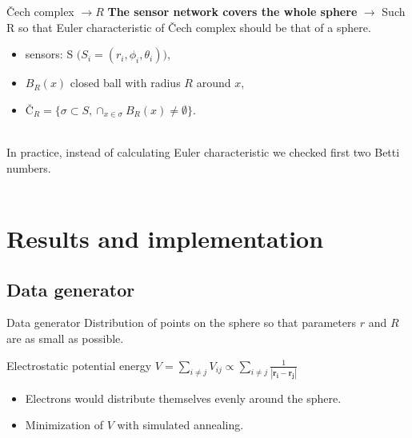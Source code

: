 \documentclass{beamer}
\newcommand{\vect}[1]{\boldsymbol{#1}}
\begin{document}
\begin{frame}{Čech complex $\longrightarrow R$}{}
\textbf{The sensor network covers the whole sphere} $\longrightarrow$ Such R so that Euler characteristic of Čech complex should be that of a sphere.
\begin{itemize}
	\item {sensors: S $\big(S_i = (r_i, \phi_i, \theta_i)\big)$,}
	\item {$B_R(x)$ closed ball with radius $R$ around $x$,}
	\item {$Č_R = \{\sigma \subset S,\cap_{x\in \sigma}B_R(x) \neq \emptyset \}$.\\~\
	}
\end{itemize}

In practice, instead of calculating Euler characteristic we checked first two Betti numbers.\\~\

\end{frame}

\section{Results and implementation}

\subsection{Data generator}
\begin{frame}{Data generator}{}
Distribution of points on the sphere so that parameters $r$ and $R$ are as small as possible.

\begin{alertblock}{Electrostatic potential energy}
	\centering $V = \sum_{i\neq j}V_{ij} \propto \sum_{i\neq j}\frac{1}{|\vect{r_i} - \vect{r_j}|}$
\end{alertblock}
\begin{itemize}
	\item {Electrons would distribute themselves evenly around the sphere. }
	\item {Minimization of $V$ with simulated annealing.}
\end{itemize}

\end{frame}
\end{document}
